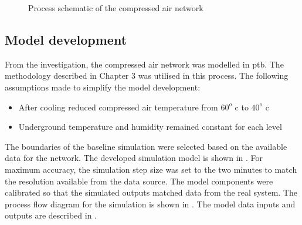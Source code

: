 	\begin{figure}[h!]
		\centering
		\caption{Process schematic of the compressed air network}
		\label{fig: KUS Air layout}
	\end{figure}
\clearpage

\subsection{Model development}
	
From the investigation, the compressed air network was modelled in \gls{ptb}. The methodology described in Chapter 3 was utilised in this process. The following assumptions made to simplify the model development:
\begin{itemize}
	\item After cooling reduced compressed air temperature from $ 60 ^o $ \gls{c} to $ 40 ^o $ \gls{c}
	\item Underground temperature and humidity remained constant for each level
\end{itemize}
 The boundaries of the baseline simulation were selected based on the available data for the network. The developed simulation model is shown in . For maximum accuracy, the simulation step size was set to the two minutes to match the resolution available from the data source.
The model components were calibrated so that the simulated outputs matched data from the real system. The process flow diagram for the simulation is shown in . The model data inputs and outputs are described in .

